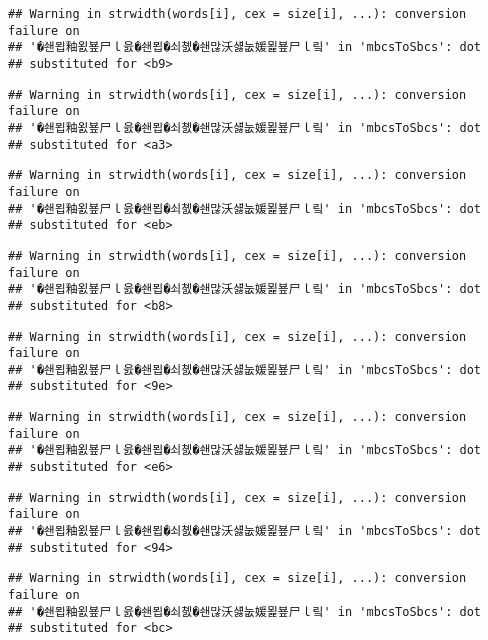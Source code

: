 \documentclass[]{article}
\begin{document}
\begin{verbatim}
## Warning in strwidth(words[i], cex = size[i], ...): conversion failure on
## '�쇈묍釉욄뵾尸ｌ읈�쇈묍�쇠쳸�쇈많沃섏눖媛묉뵾尸ｌ맄' in 'mbcsToSbcs': dot
## substituted for <b9>
\end{verbatim}

\begin{verbatim}
## Warning in strwidth(words[i], cex = size[i], ...): conversion failure on
## '�쇈묍釉욄뵾尸ｌ읈�쇈묍�쇠쳸�쇈많沃섏눖媛묉뵾尸ｌ맄' in 'mbcsToSbcs': dot
## substituted for <a3>
\end{verbatim}

\begin{verbatim}
## Warning in strwidth(words[i], cex = size[i], ...): conversion failure on
## '�쇈묍釉욄뵾尸ｌ읈�쇈묍�쇠쳸�쇈많沃섏눖媛묉뵾尸ｌ맄' in 'mbcsToSbcs': dot
## substituted for <eb>
\end{verbatim}

\begin{verbatim}
## Warning in strwidth(words[i], cex = size[i], ...): conversion failure on
## '�쇈묍釉욄뵾尸ｌ읈�쇈묍�쇠쳸�쇈많沃섏눖媛묉뵾尸ｌ맄' in 'mbcsToSbcs': dot
## substituted for <b8>
\end{verbatim}

\begin{verbatim}
## Warning in strwidth(words[i], cex = size[i], ...): conversion failure on
## '�쇈묍釉욄뵾尸ｌ읈�쇈묍�쇠쳸�쇈많沃섏눖媛묉뵾尸ｌ맄' in 'mbcsToSbcs': dot
## substituted for <9e>
\end{verbatim}

\begin{verbatim}
## Warning in strwidth(words[i], cex = size[i], ...): conversion failure on
## '�쇈묍釉욄뵾尸ｌ읈�쇈묍�쇠쳸�쇈많沃섏눖媛묉뵾尸ｌ맄' in 'mbcsToSbcs': dot
## substituted for <e6>
\end{verbatim}

\begin{verbatim}
## Warning in strwidth(words[i], cex = size[i], ...): conversion failure on
## '�쇈묍釉욄뵾尸ｌ읈�쇈묍�쇠쳸�쇈많沃섏눖媛묉뵾尸ｌ맄' in 'mbcsToSbcs': dot
## substituted for <94>
\end{verbatim}

\begin{verbatim}
## Warning in strwidth(words[i], cex = size[i], ...): conversion failure on
## '�쇈묍釉욄뵾尸ｌ읈�쇈묍�쇠쳸�쇈많沃섏눖媛묉뵾尸ｌ맄' in 'mbcsToSbcs': dot
## substituted for <bc>
\end{verbatim}
\end{document}
